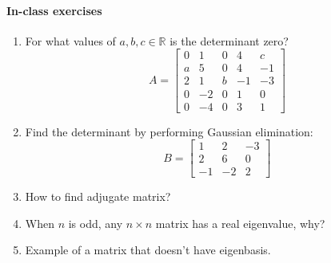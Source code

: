 \documentclass{article}
\begin{document}
\paragraph{In-class exercises}

\begin{enumerate}
    \item For what values of $a,b,c \in \mathbb R$ is the determinant zero?
    $$
    A = \begin{bmatrix}
        0 & 1 & 0 & 4 & c \\
        a & 5 & 0 & 4 & -1 \\
        2 & 1 & b & -1 & -3 \\
        0 & -2 & 0 & 1 & 0 \\
        0 & -4 & 0 & 3 & 1
    \end{bmatrix}
    $$
    \item Find the determinant by performing Gaussian elimination:
    $$
    B = \begin{bmatrix}
        1 & 2 & -3 \\
        2 & 6 & 0 \\
        -1 & -2 & 2
    \end{bmatrix}
    $$
    \item How to find adjugate matrix?

    \item When $n$ is odd, any $n \times n$ matrix has a real eigenvalue, why?

    \item Example of a matrix that doesn't have eigenbasis.
\end{enumerate}
\end{document}
